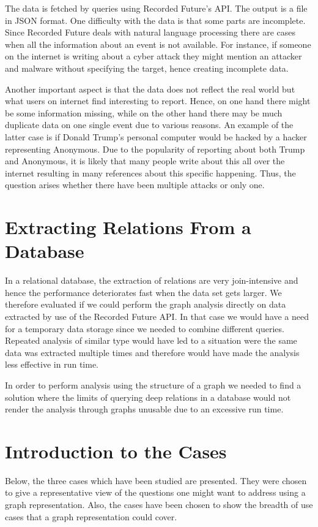 The data is fetched by queries using Recorded Future's API. The output is a file in JSON format. One difficulty with the data is that some parts are incomplete. Since Recorded Future deals with natural language processing there are cases when all the information about an event is not available. For instance, if someone on the internet is writing about a cyber attack they might mention an attacker and malware without specifying the target, hence creating incomplete data.

Another important aspect is that the data does not reflect the real world but what users on internet find interesting to report. Hence, on one hand there might be some information missing, while on the other hand there may be much duplicate data on one single event due to various reasons. An example of the latter case is if Donald Trump's personal computer would be hacked by a hacker representing Anonymous. Due to the popularity of reporting about both Trump and Anonymous, it is likely that many people write about this all over the internet resulting in many references about this specific happening. Thus, the question arises whether there have been multiple attacks or only one.

\section{Extracting Relations From a Database}
In a relational database, the extraction of relations are very join-intensive and hence the performance deteriorates fast when the data set gets larger\cite{robinson2013}. We therefore evaluated if we could perform the graph analysis directly on data extracted by use of the Recorded Future API. In that case we would have a need for a temporary data storage since we needed to combine different queries. Repeated analysis of similar type would have led to a situation were the same data was extracted multiple times and therefore would have made the analysis less effective in run time.

In order to perform analysis using the structure of a graph we needed to find a solution where the limits of querying deep relations in a database would not render the analysis through graphs unusable due to an excessive run time. 


\section{Introduction to the Cases \label{cases}}
Below, the three cases which have been studied are presented. They were chosen to give a representative view of the questions one might want to address using a graph representation. Also, the cases have been chosen to show the breadth of use cases that a graph representation could cover.

